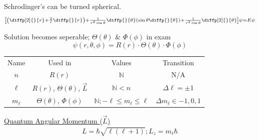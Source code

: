 \documentclass[8pt]{extarticle}
\begin{document}
        Schrodinger's can be turned spherical.
        \begin{equation*}
            {\scriptstyle \left[ \left( \diffp[2]{}{r} + \frac{2}{r}\diffp{}{r} \right) + \frac{1}{r^2\sin\theta}\diffp{}{\theta}\left( \sin\theta \diffp{}{\theta} \right) + \frac{1}{r^2\sin\theta}\diffp[2]{}{\theta}\right]\psi = E\psi}
        \end{equation*}

        Solution becomes seperable; $\Theta(\theta)$ \& $\Phi(\phi)$ in exam
        \begin{equation*}
            \psi(r,\theta,\phi) = R(r) \cdot \Theta(\theta) \cdot \Phi(\phi)
        \end{equation*}

        \begin{tabular}{c | c | c | c}
            Name        & Used in   &   Values & Transition\\
            $n$         & $R(r)$    &   $\mathbb{N}$ & N/A\\
            $\ell$      & $R(r)$, $\Theta(\theta)$, $\vec{L}$  &   $\mathbb{N} < n$ & $\Delta \ell = \pm 1$\\
            $m_\ell$    & $\Theta(\theta)$, $\Phi(\phi)$    &   $\mathbb{N}; -\ell \leq m_\ell \leq \ell$ & $\Delta m_\ell \in {-1,0,1}$
        \end{tabular}

    \underline{Quantum Angular Momentum ($\vec{L}$)}
        \begin{gather*}
            L = \hbar \sqrt{\ell(\ell + 1)};
            L_z = m_\ell \hbar
        \end{gather*}
\end{document}
